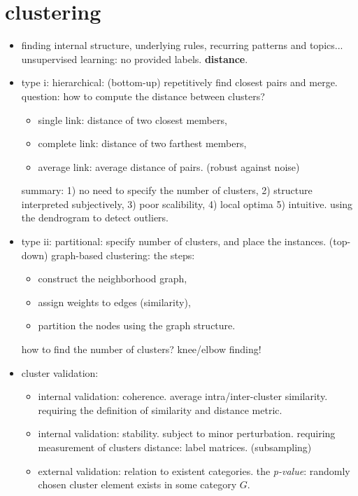 \documentclass{article}
\begin{document}
\section{clustering}
\begin{itemize}
	\item finding internal structure, underlying rules, recurring patterns and topics...
		unsupervised learning: no provided labels. {\bf distance}.
	\item type i: hierarchical: (bottom-up) repetitively find closest pairs and merge. \\
		question: how to compute the distance between clusters?
		\begin{itemize}
			\item single link: distance of two closest members, 
			\item complete link: distance of two farthest members, 
			\item average link: average distance of pairs. (robust against noise)
		\end{itemize}
		summary: 1) no need to specify the number of clusters, 2) structure
			interpreted subjectively, 3) poor scalibility, 4) local optima 5) intuitive. 
		using the dendrogram to detect outliers. 
	\item type ii: partitional: specify number of clusters, and place the instances. 
		(top-down) graph-based clustering: the steps: 
		\begin{itemize}
			\item construct the neighborhood graph,
			\item assign weights to edges (similarity), 
			\item partition the nodes using the graph structure. 
		\end{itemize}
		how to find the number of clusters? knee/elbow finding!
	\item cluster validation: 
		\begin{itemize}	
			\item internal validation: coherence. average intra/inter-cluster similarity. \\
				requiring the definition of similarity and distance metric. 
			\item internal validation: stability. subject to minor perturbation. requiring
				measurement of clusters distance: label matrices. (subsampling)
			\item external validation: relation to existent categories. the {\it p-value}: 
				randomly chosen cluster element  exists in some category $G$. 
		\end{itemize}
\end{itemize}
\end{document}
